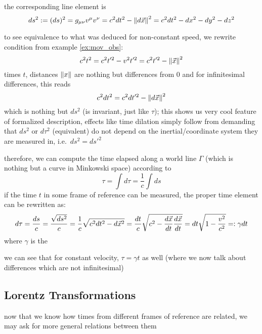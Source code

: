 the corresponding line element is
\begin{equation}
ds^2 := (ds)^2 = g_{\mu \nu} v^\mu v^\nu = c^2 dt^2 - \norm{d\vec{x}}^2 = c^2 dt^2 - dx^2 - dy^2 - dz^2
\end{equation}


to see equivalence to what was deduced for non-constant speed, we rewrite condition from example \ref{ex:mov_obs}:
\begin{equation*}
c^2 t^2 = c^2 t'^2 - v^2 t'^2 = c^2 t'^2 - \norm{\vec{x}}^2
\end{equation*}
times $t$, distances $\norm{x}$ are nothing but differences from $0$ and for infinitesimal differences, this reads
\begin{equation*}
c^2 dt^2 = c^2 dt'^2 - \norm{d\vec{x}}^2
\end{equation*}
which is nothing but $ds^2$ (is invariant, just like $\tau$); this shows us very cool feature of formalized description, effects like time dilation simply follow from demanding that $ds^2$ or $d\tau^2$ (equivalent) do not depend on the inertial/coordinate system they are measured in, i.e.~$ds^2 = ds'^2$



therefore, we can compute the time elapsed along a world line $\Gamma$ (which is nothing but a curve in Minkowski space) according to
\begin{equation}
\tau = \int d\tau = \frac{1}{c} \int ds
\end{equation}
if the time $t$ in some frame of reference can be measured, the proper time element can be rewritten as:
\begin{equation}
d\tau = \frac{ds}{c} = \frac{\sqrt{ds^2}}{c} = \frac{1}{c} \sqrt{c^2 dt^2 - d\vec{x}^2} = \frac{dt}{c} \sqrt{c^2 - \dv{\vec{x}}{t} \dv{\vec{x}}{t}} = dt \sqrt{1 - \frac{v^2}{c^2}} =: \gamma dt
\end{equation}
where $\gamma$ is the 


we can see that for constant velocity, $\tau = \gamma t$ as well (where we now talk about differences which are not infinitesimal)



		\subsection{Lorentz Transformations}
now that we know how times from different frames of reference are related, we may ask for more general relations between them


